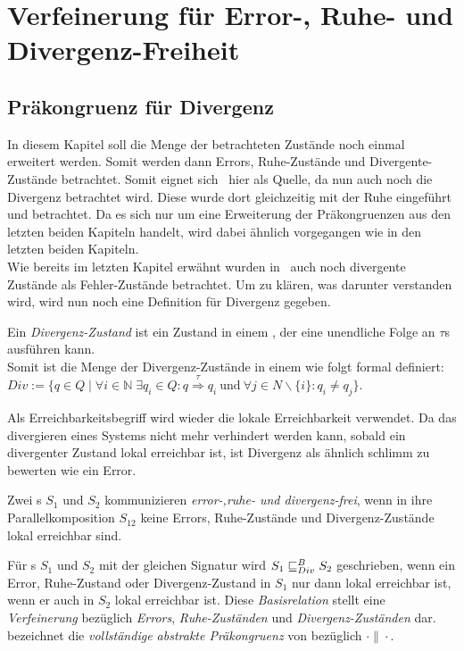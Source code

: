 \chapter{Verfeinerung für Error-, Ruhe- und Divergenz-Freiheit}

\section{Präkongruenz für Divergenz}

In diesem Kapitel soll die Menge der betrachteten Zustände noch einmal
erweitert werden. Somit werden dann Errors, Ruhe-Zustände und
Divergente-Zustände betrachtet. Somit eignet sich~\cite{Chilton2013} hier als
Quelle, da nun auch noch die Divergenz betrachtet wird. Diese wurde dort
gleichzeitig mit der Ruhe eingeführt und betrachtet. Da es sich nur um eine
Erweiterung der Präkongruenzen aus den letzten beiden Kapiteln handelt, wird
dabei ähnlich vorgegangen wie in den letzten beiden Kapiteln.\\
Wie bereits im letzten Kapitel erwähnt wurden in~\cite{Chilton2013} auch noch
divergente Zustände als Fehler-Zustände betrachtet. Um zu klären, was darunter
verstanden wird, wird nun noch eine Definition für Divergenz gegeben.

\begin{Def}[Divergenz]
  Ein \emph{Divergenz-Zustand} ist ein Zustand in einem \EIO{}, der eine
  unendliche Folge an $\tau$s ausführen kann.\\
  Somit ist die Menge der Divergenz-Zustände in einem \EIO{} wie folgt formal
  definiert: $Div := \{q\in Q\mid \forall i\in \mathbb{N}\; \exists q_i\in Q: q
  \overset{\tau}{\Rightarrow} q_i~\mathrm{und}~\forall j\in N\backslash \{i\}:
q_i\neq q_j\}$.
\end{Def}

Als Erreichbarkeitsbegriff wird wieder die lokale Erreichbarkeit verwendet.
Da das divergieren eines Systems nicht mehr verhindert werden kann, sobald ein
divergenter Zustand lokal erreichbar ist, ist Divergenz als ähnlich
\glqq{}schlimm\grqq{} zu bewerten wie ein Error.

\begin{Def}
  Zwei \EIO{}s $S_1$ und $S_2$ kommunizieren \emph{error-,ruhe- und
  divergenz-frei}, wenn in ihre Parallelkomposition $S_{12}$ keine Errors,
  Ruhe-Zustände und Divergenz-Zustände lokal erreichbar sind.
\end{Def}

\begin{Def}
Für \EIO{}s $S_1$ und $S_2$ mit der gleichen Signatur wird $S_1\sqsubseteq _{Div}^B S_2$
geschrieben, wenn ein Error, Ruhe-Zustand oder Divergenz-Zustand in $S_1$ nur
dann lokal erreichbar ist, wenn er auch in $S_2$ lokal erreichbar ist. Diese
\emph{Basisrelation} stellt eine \emph{Verfeinerung} bezüglich \emph{Errors},
\emph{Ruhe-Zuständen} und \emph{Divergenz-Zuständen} dar.\\
\DCRel{} bezeichnet die \emph{vollständige abstrakte Präkongruenz} von \DBRel{}
bezüglich $\cdot\|\cdot$.
\end{Def}

